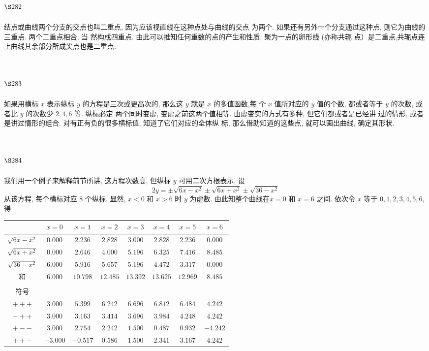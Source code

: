 \section{$\S 282$}

结点或曲线两个分支的交点也叫二重点, 因为应该视直线在这种点处与曲线的交点 为两个. 如果还有另外一个分支通过这种点, 则它为曲线的三重点. 两个二重点相合, 当 然构成四重点. 由此可以推知任何重数的点的产生和性质. 聚为一点的卵形线 (亦称共轭 点）是二重点,共轭点连上曲线其余部分所成尖点也是二重点.

\section{$\S 283$}

如果用横标 $x$ 表示纵标 $y$ 的方程是三次或更高次的, 那么这 $y$ 就是 $x$ 的多值函数,每 个 $x$ 值所对应的 $y$ 值的个数, 都或者等于 $y$ 的次数, 或者比 $y$ 的次数少 $2,4,6$ 等. 纵标必定 两个同时变虚, 变虚之前这两个值相等. 由虚变实的方式有多种, 但它们都或者是已经讲 过的情形, 或者是讲过情形的组合. 对有正有负的很多横标值, 知道了它们对应的全体纵 标, 那么借助知道的这些点, 就可以画出曲线, 确定其形状.

\section{$\S 284$}

我们用一个例子来解释前节所讲, 这方程次数高, 但纵标 $y$ 可用二次方根表示, 设
\[
2 y=\pm \sqrt{6 x-x^{2}} \pm \sqrt{6 x+x^{2}} \pm \sqrt{36-x^{2}}
\]
从该方程, 每个横标对应 8 个纵标. 显然, $x<0$ 和 $x>6$ 时 $y$ 为虚数. 由此知整个曲线在$x=0$ 和 $x=6$ 之间. 依次令 $x$ 等于 $0,1,2,3,4,5,6$, 得

\begin{tabular}{c|c|c|c|c|c|c|c}
\hline & $x=0$ & $x=1$ & $x=2$ & $x=3$ & $x=4$ & $x=5$ & $x=6$ \\
\hline$\sqrt{6 x-x^{2}}$ & $0.000$ & $2.236$ & $2.828$ & $3.000$ & $2.828$ & $2.236$ & $0.000$ \\
$\sqrt{6 x+x^{2}}$ & $0.000$ & $2.646$ & $4.000$ & $5.196$ & $6.325$ & $7.416$ & $8.485$ \\
$\sqrt{36-x^{2}}$ & $6.000$ & $5.916$ & $5.657$ & $5.196$ & $4.472$ & $3.317$ & $0.000$ \\
\hline 和 & $6.000$ & $10.798$ & $12.485$ & $13.392$ & $13.625$ & $12.969$ & $8.485$ \\
\hline & & & & & & & \\
\hline 符号 & & & & & & & \\
\hline$+++$ & $3.000$ & $5.399$ & $6.242$ & $6.696$ & $6.812$ & $6.484$ & $4.242$ \\
$-++$ & $3.000$ & $3.163$ & $3.414$ & $3.696$ & $3.984$ & $4.248$ & $4.242$ \\
$+--$ & $3.000$ & $2.754$ & $2.242$ & $1.500$ & $0.487$ & $0.932$ & $-4.242$ \\
$++-$ & $-3.000$ & $-0.517$ & $0.586$ & $1.500$ & $2.341$ & $3.167$ & $4.242$ \\
\hline
\end{tabular}

